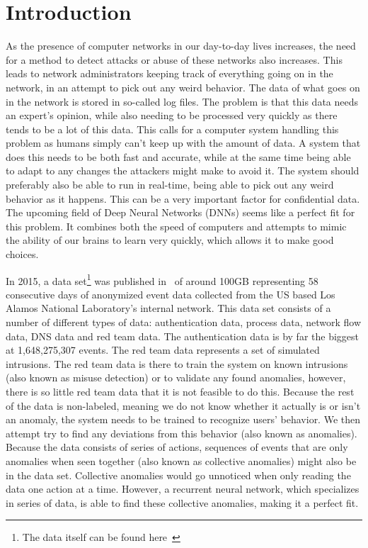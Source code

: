 \chapter{Introduction}\label{ch:introduction}
As the presence of computer networks in our day-to-day lives increases, the need for a method to detect attacks or abuse of these networks also increases. This leads to network administrators keeping track of everything going on in the network, in an attempt to pick out any weird behavior. The data of what goes on in the network is stored in so-called log files. The problem is that this data needs an expert's opinion, while also needing to be processed very quickly as there tends to be a lot of this data. This calls for a computer system handling this problem as humans simply can't keep up with the amount of data. A system that does this needs to be both fast and accurate, while at the same time being able to adapt to any changes the attackers might make to avoid it. The system should preferably also be able to run in real-time, being able to pick out any weird behavior as it happens. This can be a very important factor for confidential data. The upcoming field of Deep Neural Networks (DNNs) seems like a perfect fit for this problem. It combines both the speed of computers and attempts to mimic the ability of our brains to learn very quickly, which allows it to make good choices.

In 2015, a data set\footnote{The data itself can be found here~\cite{kent-2015-cyberdata1}} was published in~\cite{akent-2015-enterprise-data} of around 100GB representing 58 consecutive days of anonymized event data collected from the US based Los Alamos National Laboratory's internal network. This data set consists of a number of different types of data: authentication data, process data, network flow data, DNS data and red team data. The authentication data is by far the biggest at 1,648,275,307 events. The red team data represents a set of simulated intrusions. The red team data is there to train the system on known intrusions (also known as misuse detection) or to validate any found anomalies, however, there is so little red team data that it is not feasible to do this. Because the rest of the data is non-labeled, meaning we do not know whether it actually is or isn't an anomaly, the system needs to be trained to recognize users' behavior. We then attempt try to find any deviations from this behavior (also known as anomalies). Because the data consists of series of actions, sequences of events that are only anomalies when seen together (also known as collective anomalies) might also be in the data set. Collective anomalies would go unnoticed when only reading the data one action at a time. However, a recurrent neural network, which specializes in series of data, is able to find these collective anomalies, making it a perfect fit.

